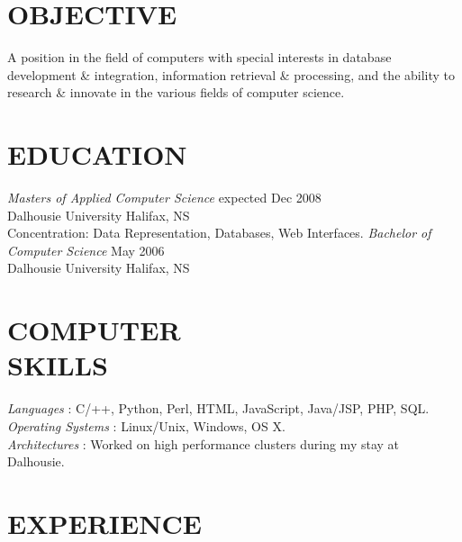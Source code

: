 \documentclass[line,margin]{res}
\begin{document}
\address{3139 Veith Street, Halifax, NS B3K 3G9}
\address{(902) 489-2557 or (902) 444-4974}

 
\begin{resume}
 
\section{OBJECTIVE}       
    A position in the field of computers with special 
    interests in database development {\&} integration, 
    information retrieval {\&} processing, and the ability to
    research {\&} innovate in the various fields of computer
    science.
 
 
\section{EDUCATION} 
    {\sl Masters of Applied Computer Science} \hfill expected Dec 2008\\
        Dalhousie University \hfill Halifax, NS\\
        Concentration: Data Representation, Databases, 
        Web Interfaces.  \medskip 
    \newline 
    {\sl Bachelor of Computer Science} \hfill May 2006\\
        Dalhousie University \hfill Halifax, NS 
 
 
\section{COMPUTER \\ SKILLS} 
    {\sl Languages \hspace{35pt}}:
     C/++, Python, Perl, HTML, JavaScript, Java/JSP, PHP, SQL.\\
    {\sl Operating Systems }:
     Linux/Unix, Windows, OS X. \\
    {\sl Architectures \hspace{27pt}}: 
     Worked on high performance clusters during my stay at \\
     \hspace*{92pt} Dalhousie. 


\section{EXPERIENCE} 


\end{resume}
\end{document}
